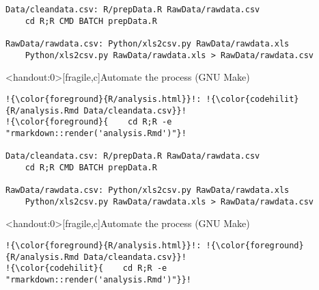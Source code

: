 \documentclass[12pt,t]{beamer}
\begin{document}
{\begin{frame}
\begin{center}
\begin{minipage}[c]{10.8cm}
\begin{semiverbatim}
\begin{lstlisting}[escapechar=!,linewidth=10.8cm]
Data/cleandata.csv: R/prepData.R RawData/rawdata.csv
    cd R;R CMD BATCH prepData.R

RawData/rawdata.csv: Python/xls2csv.py RawData/rawdata.xls
    Python/xls2csv.py RawData/rawdata.xls > RawData/rawdata.csv
\end{lstlisting}
\end{semiverbatim}
\end{minipage}
\end{center}

\end{frame}



\begin{frame}<handout:0>[fragile,c]{Automate the process (GNU Make)}

\addtocounter{framenumber}{-1}

\begin{center}
\begin{minipage}[c]{10.8cm}
\begin{semiverbatim}
\begin{lstlisting}[escapechar=!,linewidth=10.8cm]
!{\color{foreground}{R/analysis.html}}!: !{\color{codehilit}{R/analysis.Rmd Data/cleandata.csv}}!
!{\color{foreground}{    cd R;R -e "rmarkdown::render('analysis.Rmd')"}!

Data/cleandata.csv: R/prepData.R RawData/rawdata.csv
    cd R;R CMD BATCH prepData.R

RawData/rawdata.csv: Python/xls2csv.py RawData/rawdata.xls
    Python/xls2csv.py RawData/rawdata.xls > RawData/rawdata.csv
\end{lstlisting}
\end{semiverbatim}
\end{minipage}
\end{center}
\end{frame}



\begin{frame}<handout:0>[fragile,c]{Automate the process (GNU Make)}

\addtocounter{framenumber}{-1}

\begin{center}
\begin{minipage}[c]{10.8cm}
\begin{semiverbatim}
\begin{lstlisting}[escapechar=!,linewidth=10.8cm]
!{\color{foreground}{R/analysis.html}}!: !{\color{foreground}{R/analysis.Rmd Data/cleandata.csv}}!
!{\color{codehilit}{    cd R;R -e "rmarkdown::render('analysis.Rmd')"}}!


\end{lstlisting}
\end{semiverbatim}
\end{minipage}
\end{center}
\end{frame}}
\end{document}
